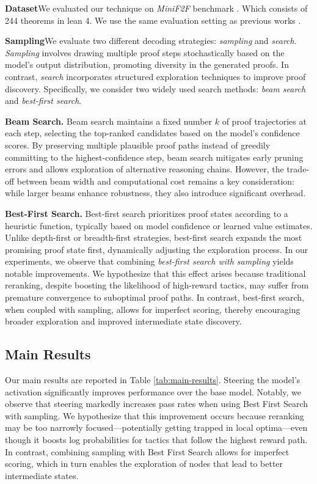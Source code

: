 \textbf{Dataset}\quad  We evaluated our technique on \textit{MiniF2F} benchmark \cite{zheng2022miniff}. Which consists of 244 theorems in lean 4. We use the same evaluation setting as previous works \cite{yang2023leandojo, llmstep, ying2024internlmmathopenmathlarge}.

\textbf{Sampling}\quad We evaluate two different decoding strategies: \textit{sampling} and \textit{search}. \textit{Sampling} involves drawing multiple proof steps stochastically based on the model’s output distribution, promoting diversity in the generated proofs. In contrast, \textit{search} incorporates structured exploration techniques to improve proof discovery. Specifically, we consider two widely used search methods: \textit{beam search} and \textit{best-first search}.  

\textbf{Beam Search.} Beam search maintains a fixed number \( k \) of proof trajectories at each step, selecting the top-ranked candidates based on the model’s confidence scores. By preserving multiple plausible proof paths instead of greedily committing to the highest-confidence step, beam search mitigates early pruning errors and allows exploration of alternative reasoning chains. However, the trade-off between beam width and computational cost remains a key consideration: while larger beams enhance robustness, they also introduce significant overhead.  

\textbf{Best-First Search.} Best-first search prioritizes proof states according to a heuristic function, typically based on model confidence or learned value estimates. Unlike depth-first or breadth-first strategies, best-first search expands the most promising proof state first, dynamically adjusting the exploration process. In our experiments, we observe that combining \textit{best-first search with sampling} yields notable improvements. We hypothesize that this effect arises because traditional reranking, despite boosting the likelihood of high-reward tactics, may suffer from premature convergence to suboptimal proof paths. In contrast, best-first search, when coupled with sampling, allows for imperfect scoring, thereby encouraging broader exploration and improved intermediate state discovery.  
\subsection{Main Results}

Our main results are reported in Table \ref{tab:main-results}. Steering the model's activation significantly improves performance over the base model. Notably, we observe that steering markedly increases pass rates when using Best First Search with sampling. We hypothesize that this improvement occurs because reranking may be too narrowly focused—potentially getting trapped in local optima—even though it boosts log probabilities for tactics that follow the highest reward path. In contrast, combining sampling with Best First Search allows for imperfect scoring, which in turn enables the exploration of nodes that lead to better intermediate states.    


